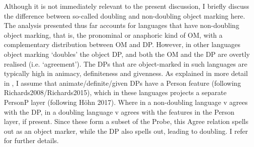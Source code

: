 \documentclass[output=paper
,modfonts
,nonflat]{langsci/langscibook}
\begin{document}
Although it is not immediately relevant to the present discussion, I briefly discuss the difference between so-called doubling and non-doubling object marking here. The analysis presented thus far accounts for languages that have non-doubling object marking, that is, the pronominal or anaphoric kind of OM, with a complementary distribution between OM and DP. However, in other languages object marking ‘doubles’ the object DP, and both the OM and the DP are overtly realised (i.e. ‘agreement’). The DPs that are object-marked in such languages are typically high in animacy, definiteness and givenness. As explained in more detail in \citet{Van_der_Wal2015}, I assume that animate/definite/given DPs have a Person feature (following Richards2008/Richards2015), %
which in these languages projects a separate PersonP layer (following Höhn 2017). %
Where in a non-doubling language v agrees with the DP, in a doubling language v agrees with the features in the Person layer, if present. Since these form a subset of the Probe, this Agree relation spells out as an object marker, while the DP also spells out, leading to doubling. I refer \citet{Van_der_Wal2015} for further details.
\begin{comment}
\begin{figure}[h!]
\begin{exe}
\ex \forestset{nice empty nodes/.style={for tree={calign=fixed edge angles}, delay={where content={}{shape=coordinate, for current and siblings={anchor=north}}{}}
		},
	} 
	\xlist
	\ex	
\begin{forest}
	[, nice empty nodes
	[v \\{\lbrack}u$\phi$: \ul  {} {\rbrack}, name=objectmarker]
	[VP [ ]
	[
	[V ]  				
	[PersP
	[{\lbrack}i$\phi${\rbrack}, name=Goal]  
	[DP [{\lbrack}i$\phi${\rbrack}, roof]]
	] ] ] ] 	
	\draw[->, thick] (objectmarker) to [out=south west,in=south west] node[near start,left]{\textit{Agree}} (Goal);	
\end{forest}
	\ex	
\begin{forest}
		[, nice empty nodes
	[v \\{\lbrack}u$\phi$: \ul  {} {\rbrack}, name=objectmarker]
	[VP [ ]
	[
	[V ]  				
	[DP [{\lbrack}i$\phi${\rbrack}, roof, name=Goal]]
	] ] ] 	
	\draw[->, thick] (objectmarker) to [out=south west,in=south west] node[near start,left]{\textit{Agree}} (Goal);	
\end{forest}
	\endxlist
\end{exe}
\end{figure}
\end{comment}
\end{document}
